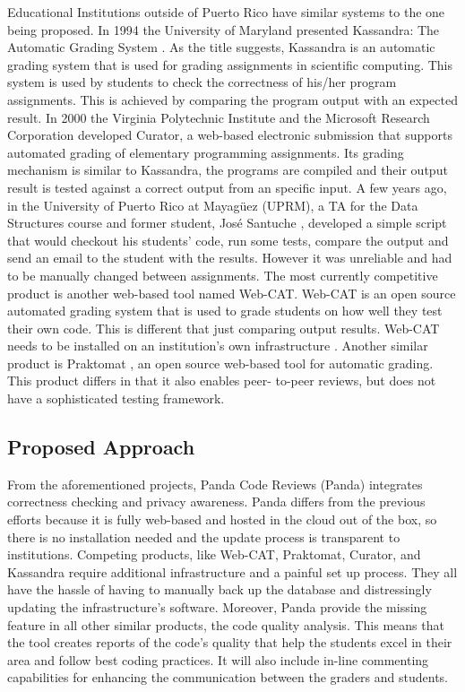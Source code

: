 Educational Institutions outside of Puerto Rico have similar systems to the one
being proposed. In 1994 the University of Maryland presented Kassandra: The
Automatic Grading System \cite{Matt1994}. As the title suggests, Kassandra is an
automatic grading system that is used for grading assignments in scientific
computing. This system is used by students to check the correctness of his/her
program assignments. This is achieved by comparing the program output with an
expected result. In 2000 the Virginia Polytechnic Institute and the Microsoft
Research Corporation developed Curator, a web-based electronic submission that
supports automated grading of elementary programming assignments. \cite{Curator}
Its grading mechanism is similar to Kassandra, the programs are compiled and
their output result is tested against a correct output from an specific input.
A few years ago, in the University of Puerto Rico at Mayagüez (UPRM), a TA for the Data 
Structures
course and former student, José Santuche \cite{Santuche}, developed a simple
script that would checkout his students' code, run some tests, compare the
output and send an email to the student with the results. However it was
unreliable and had to be manually changed between assignments. The most
currently competitive product is another web-based tool named Web-CAT. Web-CAT
is an open source automated grading system that is used to grade students on how
well they test their own code. This is different that just comparing output results. 
Web-CAT needs to be installed on an institution's own infrastructure \cite{WebCat}.
Another similar product is Praktomat \cite{Praktomat}, an open source web-based
tool for automatic grading. This product differs in that it also enables peer-
to-peer reviews, but does not have a sophisticated testing framework.


\subsection{Proposed Approach}

From the aforementioned projects, Panda Code Reviews (Panda) integrates
correctness checking and privacy awareness. Panda differs from the previous
efforts because it is fully web-based and hosted in the cloud out of the box, so
there is no installation needed and the update process is transparent to
institutions. Competing products, like Web-CAT, Praktomat, Curator, and
Kassandra require additional infrastructure and a painful set up process. They
all have the hassle of having to manually back up the database and distressingly
updating the infrastructure's software. Moreover, Panda provide the missing
feature in all other similar products, the code quality analysis. This means that the tool creates
reports of the code's quality that help the students excel in their area and
follow best coding practices. It will also include in-line commenting
capabilities for enhancing the communication between the graders and students.

